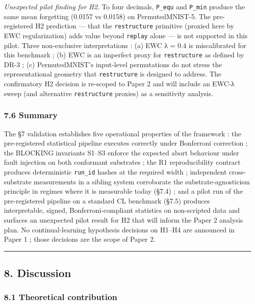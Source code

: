 \documentclass[
]{article}
\begin{document}
\emph{Unexpected pilot finding for H2.} To four decimals,
\texttt{P\_equ} and \texttt{P\_min} produce the same mean forgetting
(0.0157 vs 0.0158) on PermutedMNIST-5. The pre-registered H2 prediction
--- that the \texttt{restructure} primitive (proxied here by EWC
regularization) adds value beyond \texttt{replay} alone --- is not
supported in this pilot. Three non-exclusive interpretations : (a) EWC λ
= 0.4 is miscalibrated for this benchmark ; (b) EWC is an imperfect
proxy for \texttt{restructure} as defined by DR-3 ; (c) PermutedMNIST's
input-level permutations do not stress the representational geometry
that \texttt{restructure} is designed to address. The confirmatory H2
decision is re-scoped to Paper 2 and will include an EWC-λ sweep (and
alternative \texttt{restructure} proxies) as a sensitivity analysis.

\subsubsection{7.6 Summary}\label{summary}

The §7 validation establishes five operational properties of the
framework : the pre-registered statistical pipeline executes correctly
under Bonferroni correction ; the BLOCKING invariants S1--S3 enforce the
expected abort behaviour under fault injection on both conformant
substrates ; the R1 reproducibility contract produces deterministic
\texttt{run\_id} hashes at the required width ; independent
cross-substrate measurements in a sibling system corroborate the
substrate-agnosticism principle in regimes where it is measurable today
(§7.4) ; and a pilot run of the pre-registered pipeline on a standard CL
benchmark (§7.5) produces interpretable, signed, Bonferroni-compliant
statistics on non-scripted data and surfaces an unexpected pilot result
for H2 that will inform the Paper 2 analysis plan. No continual-learning
hypothesis decisions on H1--H4 are announced in Paper 1 ; those
decisions are the scope of Paper 2.

\begin{center}\rule{0.5\linewidth}{0.5pt}\end{center}

\subsection{8. Discussion}\label{discussion}

\subsubsection{8.1 Theoretical
contribution}\label{theoretical-contribution}
\end{document}
